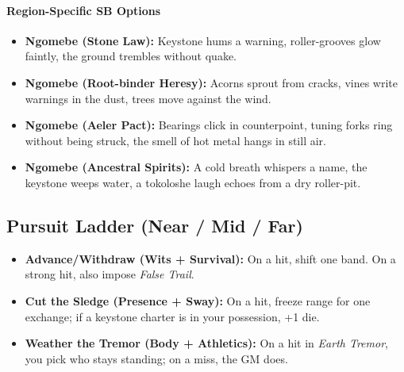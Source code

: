 \paragraph{Region-Specific SB Options}
\begin{itemize}
\item \textbf{Ngomebe (Stone Law):} Keystone hums a warning, roller-grooves glow faintly, the ground trembles without quake.
\item \textbf{Ngomebe (Root-binder Heresy):} Acorns sprout from cracks, vines write warnings in the dust, trees move against the wind.
\item \textbf{Ngomebe (Aeler Pact):} Bearings click in counterpoint, tuning forks ring without being struck, the smell of hot metal hangs in still air.
\item \textbf{Ngomebe (Ancestral Spirits):} A cold breath whispers a name, the keystone weeps water, a tokoloshe laugh echoes from a dry roller-pit.
\end{itemize}

\subsection*{Pursuit Ladder (Near / Mid / Far)}
\begin{itemize}
\item \textbf{Advance/Withdraw (Wits + Survival):} On a hit, shift one band. On a strong hit, also impose \emph{False Trail}.
\item \textbf{Cut the Sledge (Presence + Sway):} On a hit, freeze range for one exchange; if a keystone charter is in your possession, +1 die.
\item \textbf{Weather the Tremor (Body + Athletics):} On a hit in \emph{Earth Tremor}, you pick who stays standing; on a miss, the GM does.
\end{itemize}

